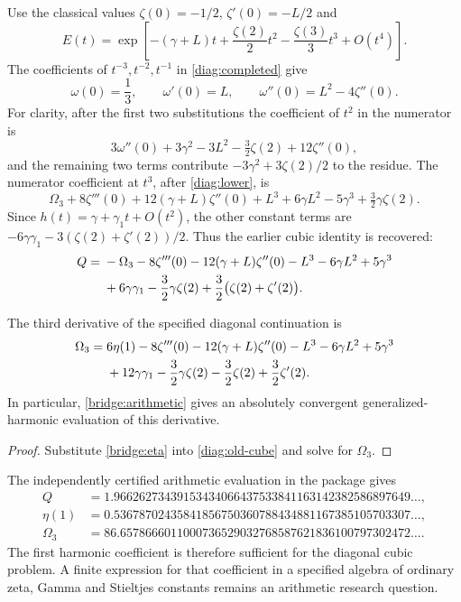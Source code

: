 Use the classical values $\zeta(0)=-1/2$, $\zeta'(0)=-L/2$ and
\[
 E(t)=\exp\left[-(\gamma+L)t+\frac{\zeta(2)}2t^2
                              -\frac{\zeta(3)}3t^3+O(t^4)\right].
\]
The coefficients of $t^{-3},t^{-2},t^{-1}$ in
\eqref{diag:completed} give
\begin{equation}\label{diag:lower}
 \omega(0)=\frac13,\qquad \omega'(0)=L,
 \qquad \omega''(0)=L^2-4\zeta''(0).
\end{equation}
For clarity, after the first two substitutions the coefficient of
$t^2$ in the numerator is
\[
 3\omega''(0)+3\gamma^2-3L^2-\tfrac32\zeta(2)+12\zeta''(0),
\]
and the remaining two terms contribute
$-3\gamma^2+3\zeta(2)/2$ to the residue.
The numerator coefficient at $t^3$, after \eqref{diag:lower}, is
\[
 \Omega_3+8\zeta'''(0)+12(\gamma+L)\zeta''(0)
 +L^3+6\gamma L^2-5\gamma^3+\tfrac32\gamma\zeta(2).
\]
Since $h(t)=\gamma+\gamma_1t+O(t^2)$, the other constant
terms are $-6\gamma\gamma_1-3(\zeta(2)+\zeta'(2))/2$.
Thus the earlier cubic identity is recovered:
\begin{align}
 Q={}&-\Omega_3-8\zeta'''(0)-12(\gamma+L)\zeta''(0)
            -L^3-6\gamma L^2+5\gamma^3\notag\\
 &+6\gamma\gamma_1-\frac32\gamma\zeta(2)
                       +\frac32\bigl(\zeta(2)+\zeta'(2)\bigr).
 \label{diag:old-cube}
\end{align}

\begin{theorem}
\label{thm:diag-harmonic}
The third derivative of the specified diagonal continuation is
\begin{align}
 \Omega_3={}&6\eta(1)-8\zeta'''(0)
 -12(\gamma+L)\zeta''(0)-L^3-6\gamma L^2+5\gamma^3\notag\\
 &+12\gamma\gamma_1-\frac32\gamma\zeta(2)
                     -\frac32\zeta(2)+\frac32\zeta'(2).
 \label{bridge:tornheim}
\end{align}
In particular, \eqref{bridge:arithmetic} gives an absolutely
convergent generalized-harmonic evaluation of this derivative.
\end{theorem}
\begin{proof}
Substitute \eqref{bridge:eta} into \eqref{diag:old-cube} and solve
for $\Omega_3$.
\end{proof}

The independently certified arithmetic evaluation in the package gives
\begin{align*}
 Q&=1.96626273439153434066437533841163142382586897649\ldots,\\
 \eta(1)&=0.53678702435841856750360788434881167385105703307\ldots,\\
 \Omega_3&=86.6578666011000736529032768587621836100797302472\ldots.
\end{align*}
The first harmonic coefficient is therefore sufficient for the
diagonal cubic problem. A finite expression for that coefficient in
a specified algebra of ordinary zeta, Gamma and Stieltjes constants
remains an arithmetic research question.
